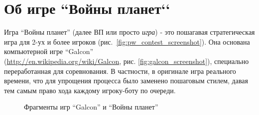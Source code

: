 \documentclass[12pt]{report}
\begin{document}
\section{Об игре ``Войны планет‘‘}
Игра ``Войны планет'' (далее ВП или просто \emph{игра}) - это пошагавая стратегическая игра для 2-ух и более игроков (рис.~\ref{fig:pw_contest_screenshot}). Она основана компьютерной игре ``Galcon'' \\(\url{http://en.wikipedia.org/wiki/Galcon}, рис. \ref{fig:galcon_screenshot}), специально переработанная для соревнования. В частности, в оригинале игра реального времени, что для упрощения процесса было заменено пошаговым стилем, давая тем самым право хода каждому игроку-боту по очереди.
\begin{figure}[h]
	\centering
	\hspace{0.5cm}
	\caption{Фрагменты игр ``Galcon''  и ``Войны планет'' }
	\label{fig:pw_screenshot}
\end{figure}
\end{document}
